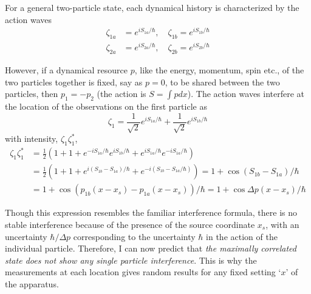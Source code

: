 For a general two-particle state, each dynamical history is characterized by the action waves
\begin{align*}
\zeta_{1a} & = e^{iS_{1a}/\hbar}, \quad \zeta_{1b}  = e^{iS_{1b}/\hbar} \tag{34}\\
\zeta_{2a} & = e^{iS_{2a} /\hbar}, \quad \zeta_{2b} = e^{iS_{2b}/\hbar} \tag{35}
\end{align*}

However, if a dynamical resource $p$, like the energy, momentum, spin etc., of the two particles
together is fixed, say as $p = 0$, to be shared between the two particles, then $p_1 = - p_2$ (the
action is $S = \int pdx$). The action waves interfere at the location of the observations on the
first particle as
\begin{equation*}
\zeta_1 = \frac{1}{\sqrt{2}} e^{iS_{1a}/ \hbar}  + \frac{1}{\sqrt{2}} e^{iS_{1b} /\hbar} \tag{36}
\end{equation*}
with intensity, $\zeta_1 \zeta_1^{\ast}$,
\begin{align*}
\zeta_1 \zeta^{\ast}_1 & = \frac{1}{2} \left(1+1+e^{-iS_{1a}/ \hbar} e^{iS_{1b} / \hbar} + e^{iS_{1a} / \hbar} e^{-iS_{1a}/\hbar} \right)\\
& = \frac{1}{2} \left( 1+1+e^{i(S_{1b} - S_{1a})/\hbar} + e^{-i(S_{1b} - S_{1a}/\hbar)} \right) = 1 + \cos (S_{1b} - S_{1a})/\hbar \tag{37}\\
& = 1 + \cos (p_{1b} (x-x_s) - p_{1a} (x-x_s)) / \hbar = 1 + \cos \Delta p (x-x_s) /\hbar \tag{38}
\end{align*}

Though this expression resembles the familiar interference formula, there is no stable interference because of the presence of the source coordinate $x_s$, with an uncertainty $\hbar/ \Delta p$ corresponding to the uncertainty $\hbar$ in the action of the individual particle. Therefore, I can
now predict that \textit{the maximally correlated state does not show any single particle interference}. This is why the measurements at each location gives random results for any fixed setting `$x$' of the apparatus.


